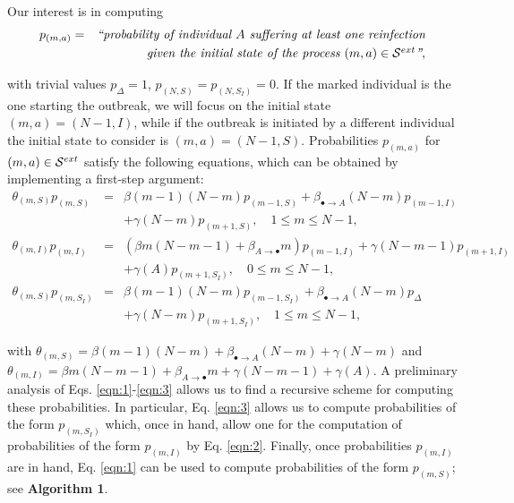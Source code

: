 \documentclass[preprint,12pt]{elsarticle}
\begin{document}
\par Our interest is in computing
\begin{eqnarray*}
 p_{(m,a)} &=& \hbox{\it ``probability of individual $A$ suffering at least one reinfection}\\
&& \hbox{\it given the initial state of the process $(m,a)\in{\cal S}^{ext}$''},
\end{eqnarray*}
\par\noindent with trivial values $p_{\Delta}=1$, $p_{(N,S)}=p_{(N,S_I)}=0$. If the marked individual is the one starting the outbreak, we will focus on
the initial state $(m,a)=(N-1,I)$, while if the outbreak is initiated by a different individual the initial state to consider is $(m,a)=(N-1,S)$. Probabilities
$p_{(m,a)}$ for $(m,a)\in{\cal S}^{ext}$ satisfy the following equations, which can be obtained by implementing a first-step argument:
\begin{eqnarray}
 \theta_{(m,S)}p_{(m,S)} &=& \beta(m-1)(N-m)p_{(m-1,S)}+\beta_{\bullet\rightarrow A}(N-m)p_{(m-1,I)}\nonumber\\
&&+\gamma(N-m)p_{(m+1,S)},\quad 1\leq m\leq N-1,\label{eqn:1}\\
 \theta_{(m,I)}p_{(m,I)} &=& \left(\beta m(N-m-1)+\beta_{A\rightarrow\bullet}m\right)p_{(m-1,I)}+\gamma (N-m-1)p_{(m+1,I)}\nonumber\\
&&+\gamma(A)p_{(m+1,S_I)},\quad 0\leq m\leq N-1,\label{eqn:2}\\
 \theta_{(m,S)}p_{(m,S_I)} &=& \beta(m-1)(N-m)p_{(m-1,S_I)}+\beta_{\bullet\rightarrow A}(N-m)p_{\Delta}\nonumber\\
&&+\gamma(N-m)p_{(m+1,S_I)},\quad 1\leq m\leq N-1,\label{eqn:3}
\end{eqnarray}
\par\noindent with $\theta_{(m,S)}=\beta(m-1)(N-m)+\beta_{\bullet\rightarrow A}(N-m)+\gamma(N-m)$ and $\theta_{(m,I)}=\beta m(N-m-1)+\beta_{A\rightarrow\bullet}m+\gamma(N-m-1)+\gamma(A)$.
A preliminary analysis of Eqs. \eqref{eqn:1}-\eqref{eqn:3} allows us to find a recursive scheme for computing these probabilities. In particular,
Eq. \eqref{eqn:3} allows us to compute probabilities of the form $p_{(m,S_I)}$ which, once in hand, allow one for the computation of probabilities of
the form $p_{(m,I)}$ by Eq. \eqref{eqn:2}. Finally, once probabilities $p_{(m,I)}$ are in hand, Eq. \eqref{eqn:1} can be used to compute
probabilities of the form $p_{(m,S)}$; see {\bf Algorithm 1}.\\
\end{document}
